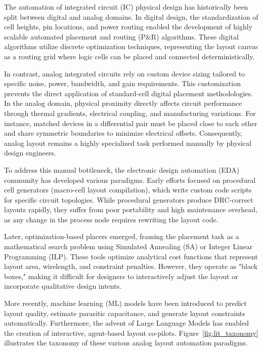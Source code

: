 The automation of integrated circuit (IC) physical design has historically been split between digital and analog domains. In digital design, the standardization of cell heights, pin locations, and power routing enabled the development of highly scalable automated placement and routing (P\&R) algorithms. These digital algorithms utilize discrete optimization techniques, representing the layout canvas as a routing grid where logic cells can be placed and connected deterministically. 

In contrast, analog integrated circuits rely on custom device sizing tailored to specific noise, power, bandwidth, and gain requirements. This customization prevents the direct application of standard-cell digital placement methodologies. In the analog domain, physical proximity directly affects circuit performance through thermal gradients, electrical coupling, and manufacturing variations. For instance, matched devices in a differential pair must be placed close to each other and share symmetric boundaries to minimize electrical offsets. Consequently, analog layout remains a highly specialized task performed manually by physical design engineers.

To address this manual bottleneck, the electronic design automation (EDA) community has developed various paradigms. Early efforts focused on procedural cell generators (macro-cell layout compilation), which write custom code scripts for specific circuit topologies. While procedural generators produce DRC-correct layouts rapidly, they suffer from poor portability and high maintenance overhead, as any change in the process node requires rewriting the layout code. 

Later, optimization-based placers emerged, framing the placement task as a mathematical search problem using Simulated Annealing (SA) or Integer Linear Programming (ILP). These tools optimize analytical cost functions that represent layout area, wirelength, and constraint penalties. However, they operate as "black boxes," making it difficult for designers to interactively adjust the layout or incorporate qualitative design intents.

More recently, machine learning (ML) models have been introduced to predict layout quality, estimate parasitic capacitance, and generate layout constraints automatically. Furthermore, the advent of Large Language Models has enabled the creation of interactive, agent-based layout co-pilots. Figure~\ref{fig:lit_taxonomy} illustrates the taxonomy of these various analog layout automation paradigms.

